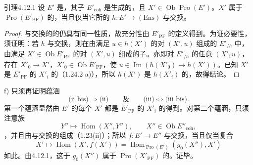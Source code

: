 \begin{SGAresult}{引理}{4.12.1}
设 $E'$ 是，其子 $E'_{\mathrm{coh}}$ 是生成的，且 $X'\in\operatorname{Ob}\operatorname{Pro}(E')$。$X'$ 属于 $\operatorname{Pro}(E'_{\mathrm{PF}})$ 的，当且仅当它所的 $h:E'\to(\mathrm{Ens})$ 与交换。
\end{SGAresult}
\begin{proof}
与交换的的仍具有同一性质，故充分性由 $E'_{\mathrm{PF}}$ 的定义得到。为证必要性，须证明：若 $h$ 与交换，则在由满足 $u\in h(X')$ 的对 $(X',u)$ 组成的 $E'_{/h}$ 中，由满足 $X'\in\operatorname{Ob}E'_{\mathrm{PF}}$ 的对 $(X',u)$ 组成的子。亦即对 $E'_{/h}$ 的任意 $(X',u)$，存在 $X'_0\to X'$，$X'_0\in\operatorname{Ob}E'_{\mathrm{PF}}$，使 $u\in\operatorname{Im}(h(X'_0)\to h(X'))$。已知 $X'$ 是 $E'_{\mathrm{PF}}$ 的 $X'_i$ 的（1.24.2 a)），所以 $h(X')$ 是 $h(X'_i)$ 的，故得结论。
\end{proof}

f) 只须再证明蕴涵
\[
\text{(ii bis)}\Rightarrow\text{(ii)}\qquad\text{及}\qquad
\text{(iii)}\Leftrightarrow\text{(iii bis)}.
\]
第一个蕴涵显然由 $E'$ 的每个 $X'$ 都是 $E'_{\mathrm{PF}}$ 的 $X'_i$ 的得到。对第二个蕴涵，只须注意族
\[
Y''\longmapsto\operatorname{Hom}(X'',Y''),\qquad X''\in\operatorname{Ob}E''_{\mathrm{coh}},
\]
，并且由与交换的组成（1.23(ii)）；所以 $f:E'\to E''$ 与交换，当且仅当复合
\[
X'\longmapsto\operatorname{Hom}(X',f(X'))
=\operatorname{Hom}_{\operatorname{Pro}(E')}(g_0(X''),X')
\]
如此。由4.12.1，这于 $g_0(X'')$ 属于 $\operatorname{Pro}(X'_{\mathrm{PF}})$ 的。证毕。

